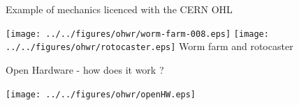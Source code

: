 \documentclass[compress,red]{beamer}
\begin{document}
\begin{frame}{Example of mechanics licenced with the CERN OHL}
  \begin{center}
    \texttt{[image: ../../figures/ohwr/worm-farm-008.eps]}
    \texttt{[image: ../../figures/ohwr/rotocaster.eps]}
   Worm farm and rotocaster
 \end{center} 
\end{frame}
\begin{frame}{Open Hardware - how does it work ?}

      \begin{center}
	\texttt{[image: ../../figures/ohwr/openHW.eps]} 
      \end{center}

\end{frame}
\end{document}

